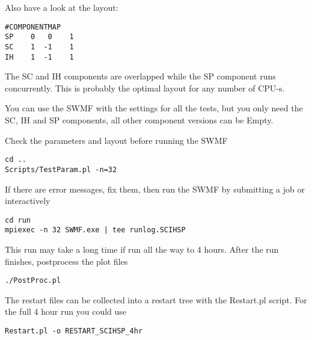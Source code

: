 Also have a look at the layout:
\begin{verbatim}
#COMPONENTMAP
SP    0   0    1 
SC    1  -1    1
IH    1  -1    1
\end{verbatim}
The SC and IH components are overlapped while the SP component
runs concurrently. This is probably the optimal layout for any
number of CPU-s.

You can use the SWMF with the settings for all the tests, 
but you only need the SC, IH and SP components,
all other component versions can be Empty.

Check the parameters and layout before running the SWMF
\begin{verbatim}
cd ..
Scripts/TestParam.pl -n=32
\end{verbatim}
If there are error messages, fix them, then run the SWMF by submitting a job
or interactively
\begin{verbatim}
cd run
mpiexec -n 32 SWMF.exe | tee runlog.SCIHSP
\end{verbatim}
This run may take a long time if run all the way to 4 hours.
After the run finishes, postprocess the plot files
\begin{verbatim}
./PostProc.pl
\end{verbatim}
The restart files can be collected into a restart tree 
with the Restart.pl script. For the full 4 hour run you could use
\begin{verbatim}
Restart.pl -o RESTART_SCIHSP_4hr
\end{verbatim}

